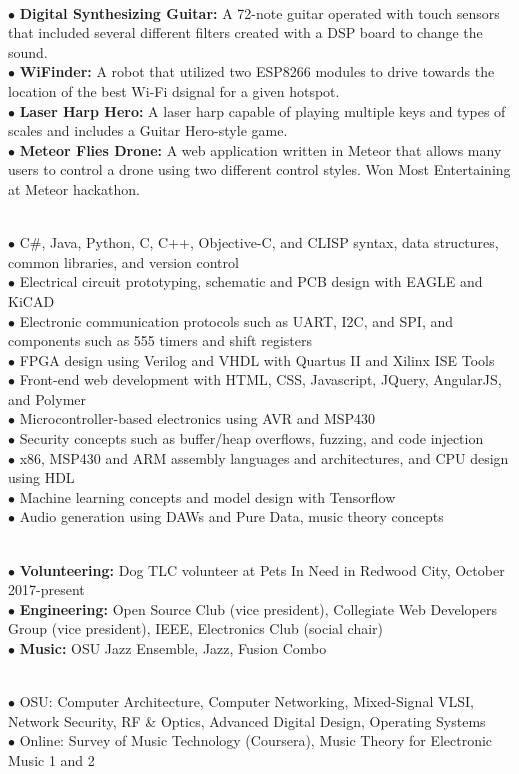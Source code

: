 \documentclass[10pt]{article}
\begin{document}
\\
$\bullet$ {\bf Digital Synthesizing Guitar:} A 72-note guitar operated with touch sensors that included several different filters created with a DSP board to change the sound.\\
$\bullet$ {\bf WiFinder:} A robot that utilized two ESP8266 modules to drive towards the location of the best Wi-Fi dsignal for a given hotspot.\\
$\bullet$ {\bf Laser Harp Hero:} A laser harp capable of playing multiple keys and types of scales and includes a Guitar Hero-style game.\\
$\bullet$ {\bf Meteor Flies Drone:} A web application written in Meteor that allows many users to control a drone using two different control styles. Won Most Entertaining at Meteor hackathon.\\
\medskip

\\
$\bullet$ C\#, Java, Python, C, C++, Objective-C, and CLISP syntax, data structures, common libraries, and version control\\
$\bullet$ Electrical circuit prototyping, schematic and PCB design with EAGLE and KiCAD\\
$\bullet$ Electronic communication protocols such as UART, I2C, and SPI, and components such as 555 timers and shift registers\\
$\bullet$ FPGA design using Verilog and VHDL with Quartus II and Xilinx ISE Tools\\
$\bullet$ Front-end web development with HTML, CSS, Javascript, JQuery, AngularJS, and Polymer\\
$\bullet$ Microcontroller-based electronics using AVR and MSP430\\
$\bullet$ Security concepts such as buffer/heap overflows, fuzzing, and code injection\\
$\bullet$ x86, MSP430 and ARM assembly languages and architectures, and CPU design using HDL\\
$\bullet$ Machine learning concepts and model design with Tensorflow\\
$\bullet$ Audio generation using DAWs and Pure Data, music theory concepts\\
\medskip

\\
$\bullet$ {\bf Volunteering:} Dog TLC volunteer at Pets In Need in Redwood City, October 2017-present\\
$\bullet$ {\bf Engineering:} Open Source Club (vice president), Collegiate Web Developers Group (vice president), IEEE, Electronics Club (social chair)\\
$\bullet$ {\bf Music:} OSU Jazz Ensemble, Jazz, Fusion Combo\\
\medskip

\\
$\bullet$ OSU: Computer Architecture, Computer Networking, Mixed-Signal VLSI, Network Security, RF \& Optics, Advanced Digital Design, Operating Systems\\
$\bullet$ Online: Survey of Music Technology (Coursera), Music Theory for Electronic Music 1 and 2
\end{document}
